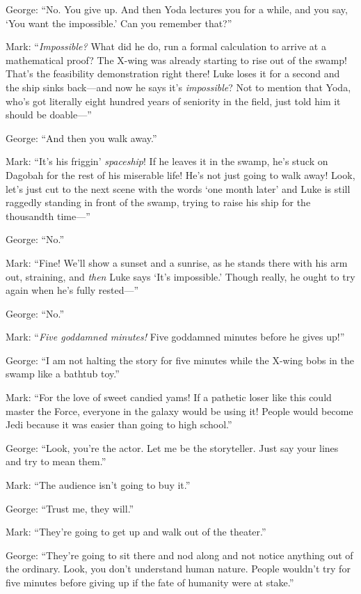 {
 George: ``No. You give up. And then Yoda lectures
you for a while, and you say, `You want the
impossible.' Can you remember
that?''}

{
 Mark: ``\textit{Impossible?} What did he do, run
a formal calculation to arrive at a mathematical proof? The X-wing was
already starting to rise out of the swamp! That's the
feasibility demonstration right there! Luke loses it for a second and
the ship sinks back---and now he says it's
\textit{impossible}? Not to mention that Yoda, who's
got literally eight hundred years of seniority in the field, just told
him it should be doable---''}

{
 George: ``And then you walk
away.''}

{
 Mark: ``It's his
friggin' \textit{spaceship}! If he leaves it in the
swamp, he's stuck on Dagobah for the rest of his
miserable life! He's not just going to walk away! Look,
let's just cut to the next scene with the words
`one month later' and Luke is still
raggedly standing in front of the swamp, trying to raise his ship for
the thousandth time---''}

{
 George: ``No.''}

{
 Mark: ``Fine! We'll show a sunset
and a sunrise, as he stands there with his arm out, straining, and
\textit{then} Luke says `It's
impossible.' Though really, he ought to try again when
he's fully rested---''}

{
 George: ``No.''}

{
 Mark: ``\textit{Five goddamned minutes!} Five
goddamned minutes before he gives up!''}

{
 George: ``I am not halting the story for five
minutes while the X-wing bobs in the swamp like a bathtub
toy.''}

{
 Mark: ``For the love of sweet candied yams! If a
pathetic loser like this could master the Force, everyone in the galaxy
would be using it! People would become Jedi because it was easier than
going to high school.''}

{
 George: ``Look, you're the actor.
Let me be the storyteller. Just say your lines and try to mean
them.''}

{
 Mark: ``The audience isn't going
to buy it.''}

{
 George: ``Trust me, they
will.''}

{
 Mark: ``They're going to get up
and walk out of the theater.''}

{
 George: ``They're going to sit
there and nod along and not notice anything out of the ordinary. Look,
you don't understand human nature. People
wouldn't try for five minutes before giving up if the
fate of humanity were at stake.''}

